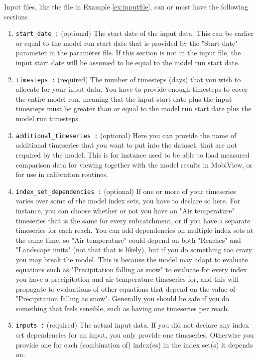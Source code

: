 \documentclass[11pt]{article}
\theoremstyle{definition}
\begin{document}
Input files, like the file in Example \ref{ex:inputfile}, can or must have the following sections
\begin{enumerate}[i]
\item {\tt start\_date :} (optional) The start date of the input data. This can be earlier or equal to the model run start date that is provided by the "Start date" parameter in the parameter file. If this section is not in the input file, the input start date will be assumed to be equal to the model run start date.
\item {\tt timesteps :} (required) The number of timesteps (days) that you wish to allocate for your input data. You have to provide enough timesteps to cover the entire model run, meaning that the input start date plus the input timesteps must be greater than or equal to the model run start date plus the model run timesteps.
\item {\tt additional\_timeseries :} (optional) Here you can provide the name of additional timeseries that you want to put into the dataset, that are not required by the model. This is for instance used to be able to load measured comparison data for viewing together with the model results in MobiView, or for use in calibration routines.
\item {\tt index\_set\_dependencies :} (optional) If one or more of your timeseries varies over some of the model index sets, you have to declare so here. For instance, you can choose whether or not you have an "Air temperature" timeseries that is the same for every subcatchment, or if you have a separate timeseries for each reach. You can add dependencies on multiple index sets at the same time, so "Air temperature" could depend on both "Reaches" and "Landscape units" (not that that is likely), but if you do something too crazy you may break the model. This is because the model may adapt to evaluate equations such as "Precipitation falling as snow" to evaluate for every index you have a precipitation and air temperature timeseries for, and this will propagate to evaluations of other equations that depend on the value of "Precipitation falling as snow". Generally you should be safe if you do something that feels sensible, such as having one timeseries per reach.
\item {\tt inputs :} (required) The actual input data. If you did not declare any index set dependencies for an input, you only provide one timeseries. Otherwise you provide one for each (combination of) index(es) in the index set(s) it depends on.
\end{enumerate}
\end{document}
